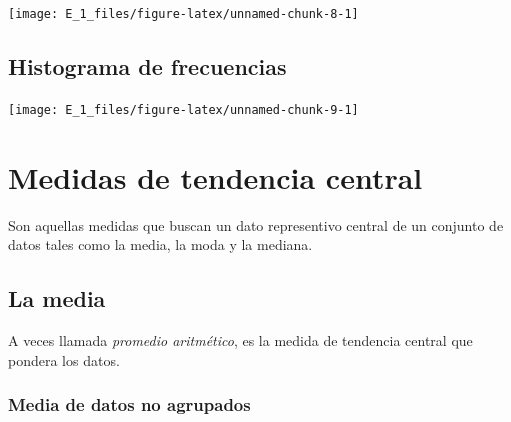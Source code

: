 \documentclass[10pt,]{krantz}
\newenvironment{Shaded}{\begin{snugshade}}{\end{snugshade}}
\newcommand{\DataTypeTok}[1]{\textcolor[rgb]{0.13,0.29,0.53}{#1}}
\newcommand{\DecValTok}[1]{\textcolor[rgb]{0.00,0.00,0.81}{#1}}
\newcommand{\KeywordTok}[1]{\textcolor[rgb]{0.13,0.29,0.53}{\textbf{#1}}}
\newcommand{\NormalTok}[1]{#1}
\newcommand{\OperatorTok}[1]{\textcolor[rgb]{0.81,0.36,0.00}{\textbf{#1}}}
\newcommand{\StringTok}[1]{\textcolor[rgb]{0.31,0.60,0.02}{#1}}
\theoremstyle{definition}
\theoremstyle{definition}
\theoremstyle{definition}
\theoremstyle{definition}
\theoremstyle{remark}
\begin{document}
\begin{center}\texttt{[image: E\_1\_files/figure-latex/unnamed-chunk-8-1]} \end{center}

\hypertarget{histograma-de-frecuencias-1}{%
\section{Histograma de frecuencias}\label{histograma-de-frecuencias-1}}

\begin{Shaded}
\end{Shaded}

\begin{center}\texttt{[image: E\_1\_files/figure-latex/unnamed-chunk-9-1]} \end{center}

\hypertarget{medidas-de-tendencia-central}{%
\chapter{Medidas de tendencia central}\label{medidas-de-tendencia-central}}

Son aquellas medidas que buscan un dato representivo central de un conjunto de datos tales como la media, la moda y la mediana.

\hypertarget{la-media}{%
\section{La media}\label{la-media}}

A veces llamada \emph{promedio aritmético}, es la medida de tendencia central que pondera los datos.

\hypertarget{media-de-datos-no-agrupados}{%
\subsection{Media de datos no agrupados}\label{media-de-datos-no-agrupados}}
\end{document}
